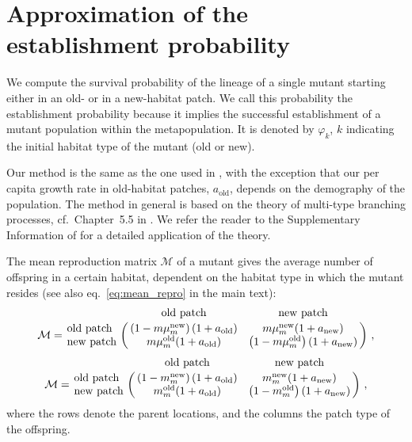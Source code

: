 \documentclass[11pt]{article}
\begin{document}
\section{Approximation of the establishment probability\label{sec:approxestabproba}}
We compute the survival probability of the lineage of a single mutant starting either in an old- or in a new-habitat patch. We call this probability the establishment probability because it implies the successful establishment of a mutant population within the metapopulation. It is denoted by $\varphi_k$, $k$ indicating the initial habitat type of the mutant (old or new).

Our method is the same as the one used in \citet{tomasini_2018}, with the exception that our per capita growth rate in old-habitat patches, $a_{\text{old}}$, depends on the demography of the population. The method in general is based on the theory of multi-type branching processes, cf.~Chapter~5.5 in \citet{haccou_book}. We refer the reader to the Supplementary Information of \citet{tomasini_2018} for a detailed application of the theory. 

The mean reproduction matrix $\mathcal{M}$ of a mutant gives the average number of offspring in a certain habitat, dependent on the habitat type in which the mutant resides (see also eq.~\eqref{eq:mean_repro} in the main text):
\begin{equation}\label{eq:repromatrix}
\mathcal{M} = \bordermatrix{ ~ & \text{old patch} & \text{new patch} \cr
	\text{old patch} & \left(1 - m \mu_m^{\text{new}} \right) (1+a_{\text{old}}) & m \mu_m^{\text{new}} (1+a_{\text{new}}) \cr
	\text{new patch} & m \mu_m^{\text{old}} (1+a_{\text{old}}) & \left(1 - m \mu_m^{\text{old}}\right) (1+a_{\text{new}})
}\ ,
\end{equation}
\begin{equation}\label{Seq:mean_repro}
\mathcal{M} = \bordermatrix{ ~ & \text{old patch} & \text{new patch} \cr
	\text{old patch} & \left(1-m_m^{\text{new}}\right) (1+a_{\text{old}}) & m_m^{\text{new}} (1+a_{\text{new}}) \cr
	\text{new patch} & m_m^{\text{old}} (1+a_{\text{old}}) & \left(1-m_m^{\text{old}}\right) (1+a_{\text{new}})
}\ ,
\end{equation}
where the rows denote the parent locations, and the columns the patch type of the offspring.
\end{document}
